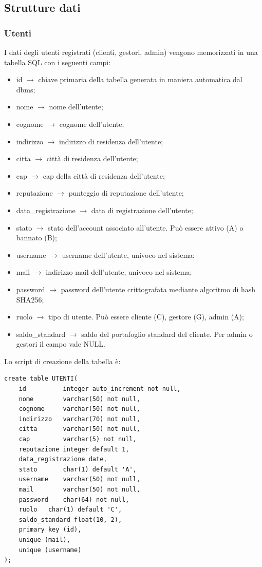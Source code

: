 \documentclass[a4paper, 14pt]{article}
\begin{document}
\begin{flushleft}
		\subsection{Strutture dati}
			\subsubsection{Utenti}
				I dati degli utenti registrati (clienti, gestori, admin) vengono memorizzati in una tabella SQL con i seguenti campi:
				\begin{itemize}
					\item id $\rightarrow$ chiave primaria della tabella generata in maniera automatica dal dbms;
					\item nome $\rightarrow$ nome dell'utente;
					\item cognome $\rightarrow$ cognome dell'utente;
					\item indirizzo $\rightarrow$ indirizzo di residenza dell'utente;
					\item citta $\rightarrow$ città di residenza dell'utente;
					\item cap $\rightarrow$ cap della città di residenza dell'utente;
					\item reputazione $\rightarrow$ punteggio di reputazione dell'utente;
					\item data\_registrazione $\rightarrow$ data di registrazione dell'utente;
					\item stato $\rightarrow$ stato dell'account associato all'utente. Può essere attivo (A) o bannato (B);
					\item username $\rightarrow$ username dell'utente, univoco nel sistema;
					\item mail $\rightarrow$ indirizzo mail dell'utente, univoco nel sistema;
					\item password $\rightarrow$ password dell'utente crittografata mediante algoritmo di hash SHA256;
					\item ruolo $\rightarrow$ tipo di utente. Può essere cliente (C), gestore (G), admin (A);
					\item saldo\_standard $\rightarrow$ saldo del portafoglio standard del cliente. Per admin o gestori il campo vale NULL.
				\end{itemize}
				Lo script di creazione della tabella è: \\
				\begin{lstlisting}
create table UTENTI(
	id          integer auto_increment not null,
	nome        varchar(50) not null,
	cognome     varchar(50) not null,
	indirizzo   varchar(70) not null,
	citta       varchar(50) not null,
	cap         varchar(5) not null,
	reputazione integer default 1,
	data_registrazione date,
	stato       char(1) default 'A',
	username    varchar(50) not null,
	mail        varchar(50) not null,
	password    char(64) not null,
	ruolo   char(1) default 'C',
	saldo_standard float(10, 2),
	primary key (id),
	unique (mail),
	unique (username)
);
				\end{lstlisting}
				\newpage

\end{flushleft}
\end{document}
